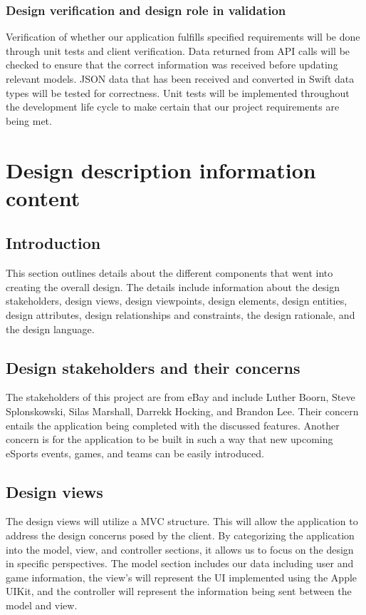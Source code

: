 \documentclass[onecolumn, draftclsnofoot,10pt, compsoc]{IEEEtran}
\begin{document}
\subsubsection{Design verification and design role in validation}
Verification of whether our application fulfills specified requirements will be done through unit tests and client verification.
Data returned from API calls will be checked to ensure that the correct information was received before updating relevant models.
JSON data that has been received and converted in Swift data types will be tested for correctness. Unit tests will be implemented throughout the development life cycle to make certain that our project requirements are being met. 

\section{Design description information content}

\subsection{Introduction}
This section outlines details about the different components that went into creating the overall design. The details include information about the design stakeholders, design views, design viewpoints, design elements, design entities, design attributes, design relationships and constraints, the design rationale, and the design language.

\subsection{Design stakeholders and their concerns}
The stakeholders of this project are from eBay and include Luther Boorn, Steve Splonskowski, Silas Marshall, Darrekk Hocking, and Brandon Lee. Their concern entails the application being completed with the discussed features. Another concern is for the application to be built in such a way that new upcoming eSports events, games, and teams can be easily introduced.

\subsection{Design views}
The design views will utilize a MVC structure. This will allow the application to address the design concerns posed by the client. By categorizing the application into the model, view, and controller sections, it allows us to focus on the design in specific perspectives. The model section includes our data including user and game information, the view's will represent the UI implemented using the Apple UIKit, and the controller will represent the information being sent between the model and view.
\end{document}
